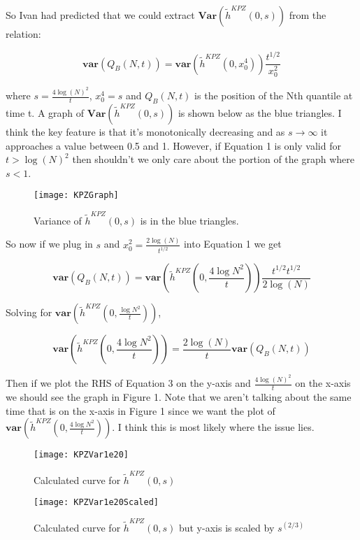 \documentclass{article}
\begin{document}
So Ivan had predicted that we could extract $\textbf{Var}(\tilde{h}^{KPZ}(0, s))$ from the relation:

\begin{equation}
\textbf{var}(Q_{B}(N, t)) = \textbf{var}(\tilde{h}^{KPZ}(0, x_{0}^{4}))\frac{t^{1/2}}{x_{0}^2}
\end{equation}

where $s=\frac{4\log(N)^{2}}{t}$, $x_{0}^{4}=s$ and $Q_{B}(N, t)$ is the position of the Nth quantile at time t. A graph of $\textbf{Var}(\tilde{h}^{KPZ}(0, s))$ is shown below as the blue triangles. I think the key feature is that it's monotonically decreasing and as $s \rightarrow \infty$ it approaches a value between 0.5 and 1. However, if Equation 1 is only valid for $t > \log(N)^{2}$ then shouldn't we only care about the portion of the graph where $s < 1$.

\begin{figure}[h]
\centering
\texttt{[image: KPZGraph]}
\caption{Variance of $\tilde{h}^{KPZ}(0, s)$ is in the blue triangles.}
\end{figure}

So now if we plug in $s$ and $x_{0}^{2}=\frac{2\log(N)}{t^{1/2}}$ into Equation 1 we get

\begin{equation}
\textbf{var}(Q_{B}(N, t)) = \textbf{var}(\tilde{h}^{KPZ}(0, \frac{4\log{N}^{2}}{t}))\frac{t^{1/2}t^{1/2}}{2\log(N)}
\end{equation}

Solving for $\textbf{var}(\tilde{h}^{KPZ}(0, \frac{\log{N}^{2}}{t}))$,

\begin{equation}
\textbf{var}(\tilde{h}^{KPZ}(0, \frac{4\log{N}^{2}}{t})) = \frac{2\log(N)}{t}\textbf{var}(Q_{B}(N, t))
\end{equation}

Then if we plot the RHS of Equation 3 on the y-axis and $\frac{4\log(N)^{2}}{t}$ on the x-axis we should
see the graph in Figure 1. Note that we aren't talking about the same time that is on the x-axis in Figure 1 since we want the plot of  $\textbf{var}(\tilde{h}^{KPZ}(0, \frac{4\log{N}^{2}}{t}))$. I think this is most likely where the issue lies.

\begin{figure}[h]
\centering
\texttt{[image: KPZVar1e20]}
\caption{Calculated curve for $\tilde{h}^{KPZ}(0, s)$}
\end{figure}

\begin{figure}[h]
\centering
\texttt{[image: KPZVar1e20Scaled]}
\caption{Calculated curve for $\tilde{h}^{KPZ}(0, s)$ but y-axis is scaled by $s^(2/3)$}
\end{figure}
\end{document}
